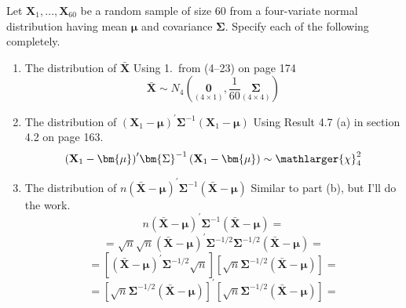 Let $\textbf{X}_{1}, \dots, \textbf{X}_{60}$ be a random sample of size 60 from a four-variate normal distribution
having mean $\bm{\mu}$ and covariance $\bm{\Sigma}$. Specify each of the following completely.
\begin{enumerate}[label= (\alph*)]
    \item The distribution of $\bar{\textbf{X}}$
    \newline
    \newline
    Using 1.~from (4--23) on page 174
    \[
        \bar{\textbf{X}}
        \sim
        N_{4}\left(\underset{(4 \times 1)}{\textbf{0}}, \frac{1}{60}\underset{(4 \times 4)}{\bm{\Sigma}}\right)
    \]

    \item The distribution of ${\left(\textbf{X}_{1} - \bm{\mu}\right)}^{\prime}\bm{\Sigma}^{-1}\left(\textbf{X}_{1} - \bm{\mu}\right)$
    \newline
    \newline
    Using Result 4.7 (a) in section 4.2 on page 163.
    \[
        {\left(\textbf{X}_{1} - \bm{\mu}\right)}^{\prime}\bm{\Sigma}^{-1}\left(\textbf{X}_{1} - \bm{\mu}\right)
        \sim
        \mathlarger{\chi}_{4}^{2}
    \]
    \item The distribution of $n{\left(\bar{\textbf{X}} - \bm{\mu}\right)}^{\prime}\bm{\Sigma}^{-1}\left(\bar{\textbf{X}} - \bm{\mu}\right)$
    \newline
    \newline
    Similar to part (b), but I'll do the work.
    \[
        n
        {\left(\bar{\textbf{X}} - \bm{\mu}\right)}^{\prime}
        \bm{\Sigma}^{-1}
        \left(\bar{\textbf{X}} - \bm{\mu}\right)
        =
    \]
    \[
        =
        \sqrt{n}
        \sqrt{n}
        {\left(\bar{\textbf{X}} - \bm{\mu}\right)}^{\prime}
        \bm{\Sigma}^{-1/2}
        \bm{\Sigma}^{-1/2}
        \left(\bar{\textbf{X}} - \bm{\mu}\right)
        =
    \]
    \[
        =
        \left[
            {\left(\bar{\textbf{X}} - \bm{\mu}\right)}^{\prime}
            \bm{\Sigma}^{-1/2}
            \sqrt{n}
        \right]
        \left[
            \sqrt{n}
            \bm{\Sigma}^{-1/2}
            \left(\bar{\textbf{X}} - \bm{\mu}\right)
        \right]
        =
    \]
    \[
        =
        {\left[
            \sqrt{n}
            \bm{\Sigma}^{-1/2}
            \left(\bar{\textbf{X}} - \bm{\mu}\right)
        \right]}^{\prime}
        \left[
            \sqrt{n}
            \bm{\Sigma}^{-1/2}
            \left(\bar{\textbf{X}} - \bm{\mu}\right)
        \right]
        =
    \]
    \[
\]
\end{enumerate}

